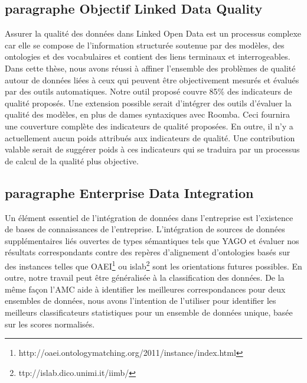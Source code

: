 \documentclass[a4paper,11pt,twoside]{ThesisStyle}
\begin{document}
\subsection{paragraphe Objectif Linked Data Quality}
Assurer la qualité des données dans Linked Open Data est un processus complexe car elle se compose de l'information structurée soutenue par des modèles, des ontologies et des vocabulaires et contient des liens terminaux et interrogeables. Dans cette thèse, nous avons réussi à affiner l'ensemble des problèmes de qualité autour de données liées à ceux qui peuvent être objectivement mesurés et évalués par des outils automatiques. Notre outil proposé couvre 85\% des indicateurs de qualité proposés. Une extension possible serait d'intégrer des outils d'évaluer la qualité des modèles, en plus de dames syntaxiques avec Roomba. Ceci fournira une couverture complète des indicateurs de qualité proposées. En outre, il n'y a actuellement aucun poids attribués aux indicateurs de qualité. Une contribution valable serait de suggérer poids à ces indicateurs qui se traduira par un processus de calcul de la qualité plus objective.

\subsection{paragraphe Enterprise Data Integration}
Un élément essentiel de l'intégration de données dans l'entreprise est l'existence de bases de connaissances de l'entreprise. L'intégration de sources de données supplémentaires liés ouvertes de types sémantiques tels que YAGO et évaluer nos résultats correspondants contre des repères d'alignement d'ontologies basés sur des instances telles que OAEI\footnote{http://oaei.ontologymatching.org/2011/instance/index.html} ou islab\footnote{ttp://islab.dico.unimi.it/iimb/} sont les orientations futures possibles. En outre, notre travail peut être généralisée à la classification des données. De la même façon l'AMC aide à identifier les meilleures correspondances pour deux ensembles de données, nous avons l'intention de l'utiliser pour identifier les meilleurs classificateurs statistiques pour un ensemble de données unique, basée sur les scores normalisés.



\vspace{-15ex}
\end{document}
